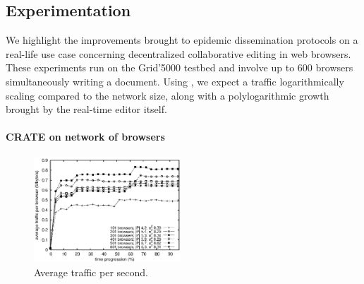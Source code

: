 
\subsection{Experimentation}
\label{subsec:experiments2}

We highlight the improvements brought to epidemic dissemination
protocols on a real-life use case concerning decentralized
collaborative editing in web browsers.  These experiments run on the
Grid'5000 testbed and involve up to 600 browsers simultaneously
writing a document. Using \SPRAY, we expect a traffic logarithmically
scaling compared to the network size, along with a polylogarithmic
growth brought by the real-time editor itself.

\vspace{-7pt}
\paragraph{CRATE on network of browsers}

\begin{figure}
  \centering
  \includegraphics[width=0.49\textwidth]{img/traffic.eps}
  \caption{\label{fig:traffic}Average traffic per second.}
\end{figure}

